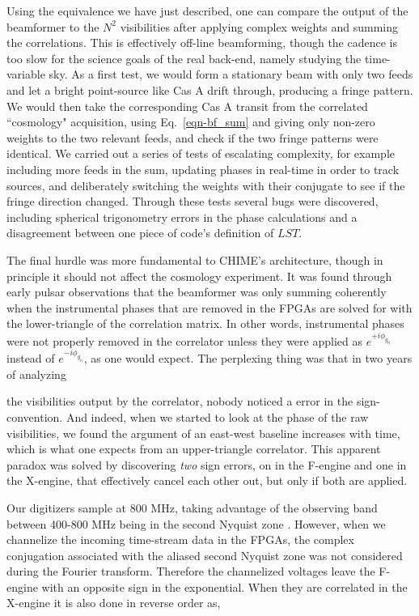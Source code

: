 Using the equivalence we have just described, one can compare the 
output of the beamformer to 
the $N^2$ visibilities after applying complex 
weights and summing the correlations. This is effectively 
off-line beamforming, though the cadence is too slow for 
the science goals of the real back-end, namely studying the time-variable sky. 
As a first test, 
we would form a stationary beam with only two feeds and let a 
bright point-source like Cas A drift through, 
producing a fringe pattern. We would then take 
the corresponding Cas A transit from the correlated ``cosmology" 
acquisition, using Eq.~\ref{eqn-bf_sum} and giving only non-zero 
weights to the two relevant feeds, and check if the two
fringe patterns were identical. We carried out a series 
of tests of escalating complexity, for example including more feeds in the sum, updating 
phases in real-time in order to track sources, and deliberately 
switching the weights with their conjugate to see if the fringe 
direction changed. Through these tests several bugs were discovered, 
including spherical trigonometry errors in the phase 
calculations and a disagreement between one piece of code's 
definition of $LST$. 

The final hurdle was more fundamental to CHIME's architecture,
though in principle it should not affect the cosmology experiment. 
It was found through 
early pulsar observations that the beamformer was only summing
coherently when the instrumental phases that are removed in 
the FPGAs are solved for with the lower-triangle of the correlation 
matrix. In other words, instrumental phases were not properly 
removed in the correlator unless they were applied as 
$e^{+i\phi_{g_n}}$ instead of $e^{-i\phi_{g_n}}$, as one would expect.
The perplexing thing was that in two years of analyzing 

the visibilities output by the correlator, nobody noticed a 
error in the sign-convention. And indeed, when we started to look
at the phase of the raw visibilities, we found the argument 
of an east-west baseline increases with time, which is 
what one expects from an upper-triangle correlator. This 
apparent paradox was solved by discovering \textit{two} sign errors, 
on in the F-engine and one in the X-engine, that
effectively cancel each other out, but only if both are applied. 

Our digitizers sample at 800 MHz, taking advantage of the observing 
band between 400-800 MHz being in the second Nyquist zone \cite{}. 
However, when we channelize
the incoming time-stream data in the FPGAs, the complex conjugation 
associated with the aliased second Nyquist zone was not considered during the 
Fourier transform. Therefore the channelized voltages leave the F-engine 
with an opposite sign in the exponential. When they are correlated
in the X-engine it is also done in reverse order as, 


